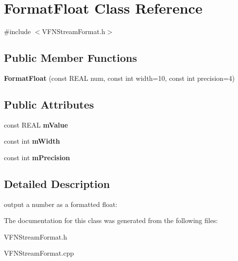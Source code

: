 \hypertarget{class_format_float}{}\section{Format\+Float Class Reference}
\label{class_format_float}


{\ttfamily \#include $<$V\+F\+N\+Stream\+Format.\+h$>$}

\subsection*{Public Member Functions}
\begin{DoxyCompactItemize}
\item 
\mbox{\label{class_format_float_a9fbcfe7405d478396858e748dd7df56d}} 
{\bfseries Format\+Float} (const R\+E\+AL num, const int width=10, const int precision=4)
\end{DoxyCompactItemize}
\subsection*{Public Attributes}
\begin{DoxyCompactItemize}
\item 
\mbox{\label{class_format_float_a09d44759a75e7d27abde5fb4d08870bd}} 
const R\+E\+AL {\bfseries m\+Value}
\item 
\mbox{\label{class_format_float_a6933d0fb1fb1301fe9572e2048d06ade}} 
const int {\bfseries m\+Width}
\item 
\mbox{\label{class_format_float_a2f9e8289795d3d9916873c105f0db4b3}} 
const int {\bfseries m\+Precision}
\end{DoxyCompactItemize}


\subsection{Detailed Description}
output a number as a formatted float\+:


\begin{DoxyCode}{0}
\end{DoxyCode}
 

The documentation for this class was generated from the following files\+:\begin{DoxyCompactItemize}
\item 
V\+F\+N\+Stream\+Format.\+h\item 
V\+F\+N\+Stream\+Format.\+cpp\end{DoxyCompactItemize}
